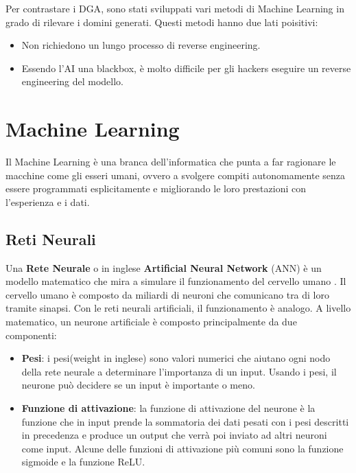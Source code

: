 \documentclass[12pt,a4paper,openright,twoside]{book}
\begin{document}
Per contrastare i \acrshort{DGA}, sono stati sviluppati
vari metodi di Machine Learning in grado di rilevare i domini generati.
Questi metodi hanno due lati poisitivi:
\begin{itemize}
    \item Non richiedono un lungo processo di reverse engineering.
    \item Essendo l'AI una blackbox, è molto difficile
    per gli hackers eseguire un reverse engineering del modello.
\end{itemize}

\section{Machine Learning}
Il Machine Learning è una branca dell'informatica che punta
a far ragionare le macchine come gli esseri umani, ovvero
a svolgere compiti autonomamente senza essere programmati
esplicitamente e migliorando le loro prestazioni con l'esperienza
e i dati.



\subsection{Reti Neurali}

Una \textbf{Rete Neurale} o in inglese \textbf{Artificial Neural Network} (ANN) è
un modello matematico che mira a simulare il
funzionamento del cervello umano \cite{zou2009overview}.
Il cervello umano è composto da miliardi di neuroni
che comunicano tra di loro tramite sinapsi.
Con le reti neurali artificiali, il funzionamento
è analogo. A livello matematico, un neurone artificiale è composto principalmente
da due componenti:
\begin{itemize}
    \item \textbf{Pesi}: i pesi(weight in inglese) sono valori numerici che
    aiutano ogni nodo della rete neurale a determinare
    l'importanza di un input. Usando i pesi, il neurone
    può decidere se un input è importante o meno.
    \item \textbf{Funzione di attivazione}: la funzione di attivazione del neurone è la funzione
    che in input prende la sommatoria dei dati pesati con i pesi descritti in
    precedenza e produce un output che verrà poi inviato ad altri neuroni come
    input. Alcune delle funzioni di attivazione più comuni sono la funzione
    sigmoide e la funzione ReLU.
\end{itemize}
\end{document}
